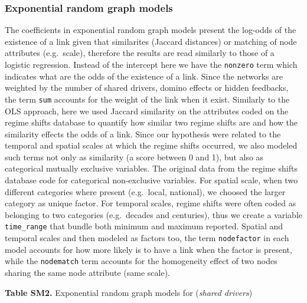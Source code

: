 \documentclass[9pt,]{article}
\begin{document}
\endgroup 

\subsubsection{Exponential random graph
models}\label{exponential-random-graph-models}

The coefficients in exponential random graph models present the log-odds
of the existence of a link given that similarites (Jaccard distances) or
matching of node attributes (e.g.~scale), therefore the results are read
similarly to those of a logistic regression. Instead of the intercept
here we have the \texttt{nonzero} term which indicates what are the odds
of the existence of a link. Since the networks are weighted by the
number of shared drivers, domino effects or hidden feedbacks, the term
\texttt{sum} accounts for the weight of the link when it exist.
Similarly to the OLS approach, here we used Jaccard similarity on the
attributes coded on the regime shifts database to quantify how similar
two regime shifts are and how the similarity effects the odds of a link.
Since our hypothesis were related to the temporal and spatial scales at
which the regime shifts occurred, we also modeled such terms not only as
similarity (a score between 0 and 1), but also as categorical mutually
exclusive variables. The original data from the regime shifts database
code for categorical non-exclusive variables. For spatial scale, when
two different categories where present (e.g.~local, national), we
choosed the larger category as unique factor. For temporal scales,
regime shifts were often coded as belonging to two categories
(e.g.~decades and centuries), thus we create a variable
\texttt{time\_range} that bundle both minimum and maximum reported.
Spatial and temporal scales and then modeled as factors too, the term
\texttt{nodefactor} in each model accounts for how more likely is to
have a link when the factor is present, while the \texttt{nodematch}
term accounts for the homogeneity effect of two nodes sharing the same
node attribute (same scale).

\textbf{Table SM2.} Exponential random graph models for
(\textit{shared drivers})

\begingroup  \footnotesize 
\end{document}
